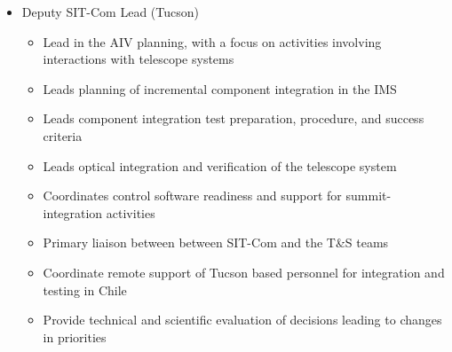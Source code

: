 \documentclass[SE,toc]{lsstdoc}
\begin{document}
\begin{itemize}
\begin{itemize}
    \end{itemize}
\item Deputy SIT-Com Lead (Tucson)
    \begin{itemize}
        \item Lead in the AIV planning, with a focus on activities involving interactions with telescope systems
        \item Leads planning of incremental component integration in the IMS
        \item Leads component integration test preparation, procedure, and success criteria
        \item Leads optical integration and verification of the telescope system
        \item Coordinates control software readiness and support for summit-integration activities
        \item Primary liaison between between SIT-Com and the T\&S teams
        \item Coordinate remote support of Tucson based personnel for integration and testing in Chile
        \item Provide technical and scientific evaluation of decisions leading to changes in priorities
    \end{itemize}
\end{itemize}
\end{document}
